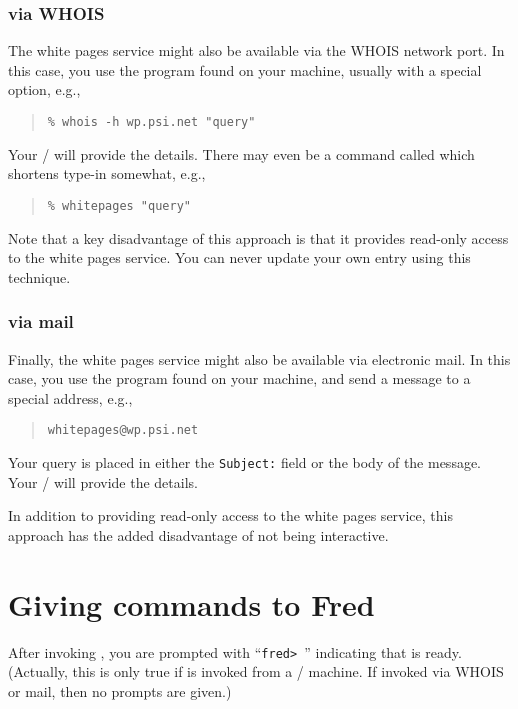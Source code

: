 \subsubsection	{via WHOIS}
The white pages service might also be available via the WHOIS network port.
In this case,
you use the  program found on your machine,
usually with a special option,
e.g.,
\begin{quote}\small\begin{verbatim}
% whois -h wp.psi.net "query"
\end{verbatim}\end{quote}
Your \camayoc/ will provide the details.
There may even be a command called  which shortens type-in
somewhat,
e.g.,
\begin{quote}\small\begin{verbatim}
% whitepages "query"
\end{verbatim}\end{quote}
Note that a key disadvantage of this approach is that it provides read-only
access to the white pages service.
You can never update your own entry using this technique.

\subsubsection	{via mail}
Finally,
the white pages service might also be available via electronic mail.
In this case,
you use the  program found on your machine,
and send a message to a special address,
e.g.,
\begin{quote}\small\begin{verbatim}
whitepages@wp.psi.net
\end{verbatim}\end{quote}
Your query is placed in either the \verb"Subject:" field or the body of the
message.
Your \camayoc/ will provide the details.

In addition to providing read-only access to the white pages service,
this approach has the added disadvantage of not being interactive.

\section	{Giving commands to Fred}\label{fred:commands}
After invoking ,
you are prompted with ``\verb"fred> "'' indicating that  is ready.
(Actually,
this is only true if  is invoked from a \unix/ machine.
If invoked via WHOIS or mail,
then no prompts are given.)

